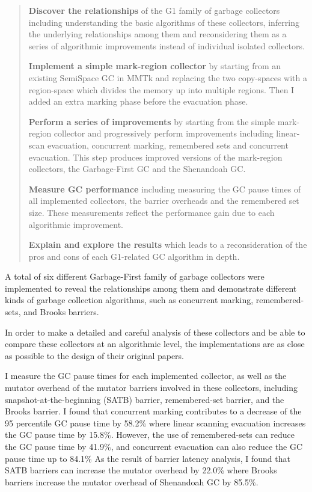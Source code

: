\begin{quote}
  \textbf{Discover the relationships}
    of the G1 family of garbage collectors including understanding the basic algorithms
    of these collectors, inferring the underlying relationships among them and reconsidering them as
    a series of algorithmic improvements instead of individual isolated collectors.

  \textbf{Implement a simple mark-region collector}
    by starting from an existing SemiSpace GC in MMTk and replacing the two copy-spaces
    with a region-space which divides the memory up into multiple regions.
    Then I added an extra marking phase before the evacuation phase.

  \textbf{Perform a series of improvements}
    by starting from the simple mark-region collector and progressively perform
    improvements including linear-scan evacuation, concurrent marking, remembered sets
    and concurrent evacuation. This step produces improved versions of the
    mark-region collectors, the Garbage-First GC and the Shenandoah GC.

  \textbf{Measure GC performance}
    including measuring the GC pause times of all implemented collectors, the 
    barrier overheads and the remembered set size. These measurements reflect the
    performance gain due to each algorithmic improvement.

  \textbf{Explain and explore the results} which leads to a reconsideration
    of the pros and cons of each G1-related GC algorithm in depth.
\end{quote}

A total of six different Garbage-First family of garbage collectors were implemented to reveal
the relationships among them and demonstrate different kinds of garbage collection
algorithms, such as concurrent marking, remembered-sets, and Brooks barriers.

In order to make a detailed and careful analysis of these collectors and
be able to compare these collectors at an algorithmic level, the implementations
are as close as possible to the design of their original papers.

I measure the GC pause times for each implemented collector, as well as the mutator
overhead of the mutator barriers involved in these collectors, including
snapshot-at-the-beginning (SATB) barrier, remembered-set barrier, and the Brooks barrier.
I found that concurrent marking contributes to a decrease of the 95 percentile GC pause time by 58.2\%
where linear scanning evacuation increases the GC pause time by 15.8\%.
However, the use of remembered-sets can reduce the GC pause time by 41.9\%,
and concurrent evacuation can also reduce the GC pause time up to 84.1\%
As the result of barrier latency analysis, I found that SATB barriers can
increase the mutator overhead by 22.0\% where Brooks barriers
increase the mutator overhead of Shenandoah GC by 85.5\%.

